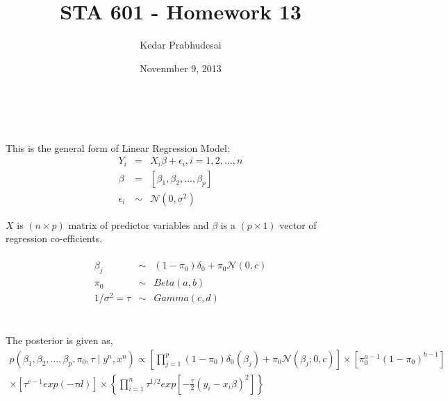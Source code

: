 \documentclass{article}
\title{STA 601 - Homework 13}
\author{Kedar Prabhudesai}
\date{Novenmber 9, 2013}
\begin{document}
\maketitle

\\

\\

This is the general form of Linear Regression Model:
\begin{eqnarray*}
Y_i &=& X_i\beta + \epsilon_i, i = 1,2,\ldots,n\\
\beta &=& [\beta_1,\beta_2,\ldots,\beta_p]\\
\epsilon_i &\sim& \mathcal{N}(0,\sigma^2)
\end{eqnarray*}

$X$ is $(n \times p)$ matrix of predictor variables and $\beta$ is a $(p \times 1)$ vector of regression co-efficients.\\

\\
\begin{eqnarray*}
\beta_j &\sim& (1 - \pi_0)\delta_0 + \pi_0\mathcal{N}(0,c)\\
\pi_0 &\sim& Beta(a,b)\\
1/\sigma^2 = \tau &\sim& Gamma(c,d)\\
\end{eqnarray*}

\\

The posterior is given as,\\
\begin{eqnarray*}
p(\beta_1,\beta_2,\ldots,\beta_p,\pi_0,\tau \mid y^n,x^n) \propto \left[\prod_{j=1}^p{(1 - \pi_0)\delta_0(\beta_j) + \pi_0\mathcal{N}(\beta_j;0,c)}\right] \times \left[\pi_0^{a-1}(1 - \pi_0)^{b-1}\right]\\ \times \left[\tau^{c-1}exp(-\tau d)\right] \times \left\{\prod_{i=1}^n{\tau^{1/2}exp\left[-\frac{\tau}{2}(y_i - x_i\beta)^2\right]}\right\}
\end{eqnarray*}

\pagebreak

\\
\end{document}
